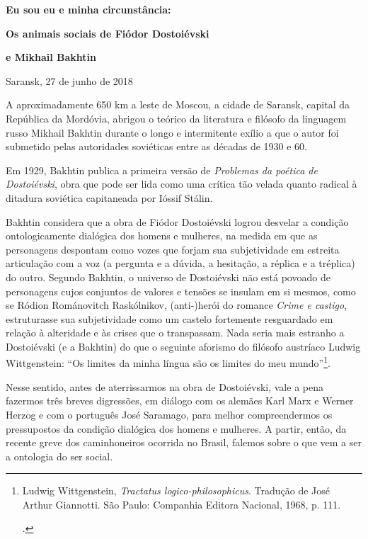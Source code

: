 \textbf{Eu sou eu e minha circunstância: }

\textbf{Os animais sociais de Fiódor Dostoiévski }

\textbf{e Mikhail Bakhtin}

Saransk, 27 de junho de 2018

A aproximadamente 650 km a leste de Moscou, a cidade de Saransk, capital
da República da Mordóvia, abrigou o teórico da literatura e filósofo da
linguagem russo Mikhail Bakhtin durante o longo e intermitente exílio a
que o autor foi submetido pelas autoridades soviéticas entre as décadas
de 1930 e 60.

Em 1929, Bakhtin publica a primeira versão de \emph{Problemas da poética
de Dostoiévski}, obra que pode ser lida como uma crítica tão velada
quanto radical à ditadura soviética capitaneada por Ióssif Stálin.

Bakhtin considera que a obra de Fiódor Dostoiévski logrou desvelar a
condição ontologicamente dialógica dos homens e mulheres, na medida em
que as personagens despontam como vozes que forjam sua subjetividade em
estreita articulação com a voz (a pergunta e a dúvida, a hesitação, a
réplica e a tréplica) do outro. Segundo Bakhtin, o universo de
Dostoiévski não está povoado de personagens cujos conjuntos de valores e
tensões se insulam em si mesmos, como se Ródion Románovitch Raskólnikov,
(anti-)herói do romance \emph{Crime e castigo}, estruturasse sua
subjetividade como um castelo fortemente resguardado em relação à
alteridade e às crises que o transpassam. Nada seria mais estranho a
Dostoiévski (e a Bakhtin) do que o seguinte aforismo do filósofo
austríaco Ludwig Wittgenstein: ``Os limites da minha língua são os
limites do meu mundo''\footnote{Ludwig Wittgenstein, \emph{Tractatus
  logico-philosophicus}. Tradução de José Arthur Giannotti. São Paulo:
  Companhia Editora Nacional, 1968, p. 111.

  .}.

Nesse sentido, antes de aterrissarmos na obra de Dostoiévski, vale a
pena fazermos três breves digressões, em diálogo com os alemães Karl
Marx e Werner Herzog e com o português José Saramago, para melhor
compreendermos os pressupostos da condição dialógica dos homens e
mulheres. A partir, então, da recente greve dos caminhoneiros ocorrida
no Brasil, falemos sobre o que vem a ser a ontologia do ser social.

